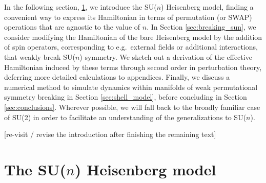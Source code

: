 \documentclass[nofootinbib,notitlepage,11pt]{revtex4-2}
\newcommand{\1}{\mathds{1}}
\newcommand{\red}[1]{{\color{red} #1}}
\begin{document}
In the following section, \ref{sec:bare_sun}, we introduce the SU($n$)
Heisenberg model, finding a convenient way to express its Hamiltonian
in terms of permutation (or SWAP) operations that are agnostic to the
value of $n$.  In Section \ref{sec:breaking_sun}, we consider
modifying the Hamiltonian of the bare Heisenberg model by the addition
of spin operators, corresponding to e.g.~external fields or additional
interactions, that weakly break SU($n$) symmetry.  We sketch out a
derivation of the effective Hamiltonian induced by these terms through
second order in perturbation theory, deferring more detailed
calculations to appendices.  Finally, we discuss a numerical method to
simulate dynamics within manifolds of weak permutational symmetry
breaking in Section \ref{sec:shell_model}, before concluding in
Section \ref{sec:conclusions}.  Wherever possible, we will fall back
to the broadly familiar case of SU(2) in order to facilitate an
understanding of the generalizations to SU($n$).

\red{[re-visit / revise the introduction after finishing the remaining
  text]}

\section{The SU($n$) Heisenberg model}
\label{sec:bare_sun}
\end{document}
